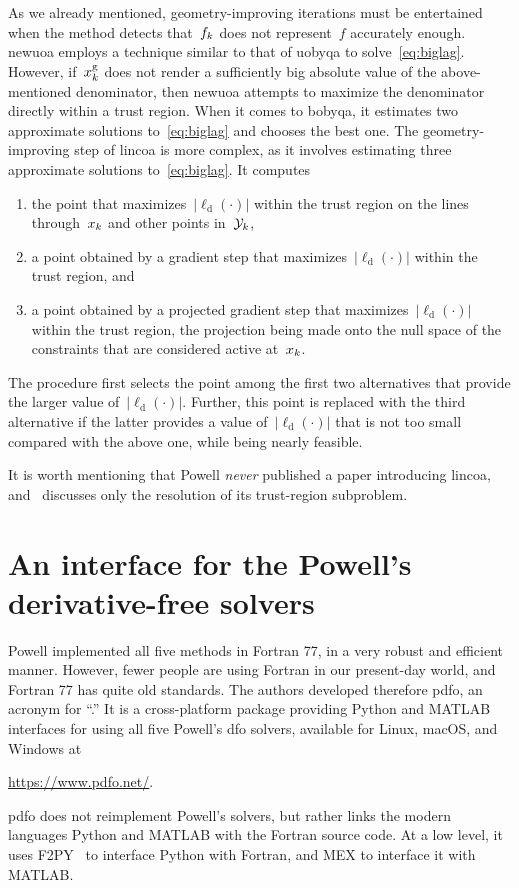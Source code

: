 \documentclass[
    smallextended,  %
    draft,          %
]{svjour3}
\newcommand{\abs}[2][]{#1\lvert#2#1\rvert}
\newcommand{\drop}{{\text{d}}}
\newcommand{\geo}{{\text{g}}}
\newcommand{\iter}[1][k]{x\ifthenelse{\equal{#1}{}}{}{_{#1}}}
\newcommand{\objm}[1][k]{\obj\ifthenelse{\equal{#1}{}}{}{_{#1}}}
\newcommand{\obj}{f}
\newcommand{\xpt}[1][k]{\mathcal{Y}\ifthenelse{\equal{#1}{}}{}{_{#1}}}
\begin{document}
As we already mentioned, geometry-improving iterations must be entertained when the method detects that~$\objm$ does not represent~$\obj$ accurately enough.
\Gls{newuoa} employs a technique similar to that of \gls{uobyqa} to solve~\eqref{eq:biglag}.
However, if~$\iter^{\geo}$ does not render a sufficiently big absolute value of the above-mentioned denominator, then \gls{newuoa} attempts to maximize the denominator directly within a trust region.
When it comes to \gls{bobyqa}, it estimates two approximate solutions to~\eqref{eq:biglag} and chooses the best one.
The geometry-improving step of \gls{lincoa} is more complex, as it involves estimating three approximate solutions to~\eqref{eq:biglag}.
It computes
\begin{enumerate}
    \item the point that maximizes~$\abs{\ell_{\drop}(\cdot)}$ within the trust region on the lines through~$\iter$ and other points in~$\xpt$,
    \item a point obtained by a gradient step that maximizes~$\abs{\ell_{\drop}(\cdot)}$ within the trust region, and
    \item a point obtained by a projected gradient step that maximizes~$\abs{\ell_{\drop}(\cdot)}$ within the trust region, the projection being made onto the null space of the constraints that are considered active at~$\iter$.
\end{enumerate}
The procedure first selects the point among the first two alternatives that provide the larger value of~$\abs{\ell_{\drop}(\cdot)}$.
Further, this point is replaced with the third alternative if the latter provides a value of~$\abs{\ell_{\drop}(\cdot)}$ that is not too small compared with the above one, while being nearly feasible.

It is worth mentioning that Powell \emph{never} published a paper introducing \gls{lincoa}, and~\cite{Powell_2015} discusses only the resolution of its trust-region subproblem.

\section{An interface for the Powell's derivative-free solvers}
\label{sec:pdfo}

Powell implemented all five methods in Fortran 77, in a very robust and efficient manner.
However, fewer people are using Fortran in our present-day world, and Fortran 77 has quite old standards.
The authors developed therefore \gls{pdfo}, an acronym for ``.''
It is a cross-platform package providing Python and MATLAB interfaces for using all five Powell's \gls{dfo} solvers, available for Linux, macOS, and Windows at
\begin{center}
    \url{https://www.pdfo.net/}.
\end{center}
\Gls{pdfo} does not reimplement Powell's solvers, but rather links the modern languages Python and MATLAB with the Fortran source code.
At a low level, it uses F2PY~\cite{Peterson_2009} to interface Python with Fortran, and MEX to interface it with MATLAB.
\end{document}
